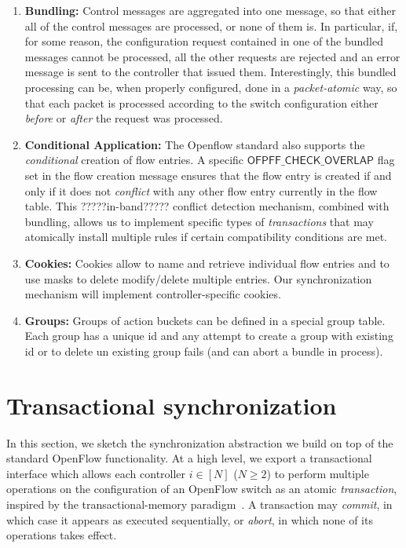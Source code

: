 \documentclass[conference]{sigcomm-alternate}
\begin{document}
\begin{enumerate}
\item \textbf{Bundling:}
Control messages are aggregated into one message, so that either all of the control messages are
processed, or none of them is. In particular, if, for some reason, the
configuration request contained in one of the bundled messages cannot
be processed, all the other requests  are rejected and an error
message is sent to the controller that issued them.
Interestingly, this bundled processing can be, when properly configured, done in a
\emph{packet-atomic} way, so that each packet is processed according
to the switch configuration either \emph{before} or \emph{after} the
request was processed.

\item \textbf{Conditional Application:}
The Openflow standard also supports the \emph{conditional} creation of
flow entries. A specific $\textsf{OFPFF\_CHECK\_OVERLAP}$ flag
set in the flow creation message ensures
that the flow entry is created if and only if it does not \emph{conflict}
with any other flow entry currently in the flow table.
This ?????in-band????? conflict detection mechanism, combined with bundling,
allows us to implement specific types of \emph{transactions} that may
atomically install multiple rules if certain compatibility conditions
are met.

\item \textbf{Cookies:} Cookies allow to name and retrieve individual
flow entries and to use masks to delete modify/delete multiple entries. Our synchronization mechanism will implement controller-specific cookies.

\item \textbf{Groups:} Groups of action buckets can be defined in a special group table. Each group has a unique id and any attempt to create a group with existing id or to delete un existing group fails (and can abort a bundle in process).
\end{enumerate}

\section{Transactional synchronization}\label{sec:vision}

In this section, we sketch the synchronization abstraction we build on
top of the standard OpenFlow functionality. At a high level, we export a
transactional interface which allows each controller $i\in[N]$ ($N\geq
2$) to perform multiple
operations on the configuration of an OpenFlow switch as an atomic
\emph{transaction}, inspired by the transactional-memory paradigm~\cite{stm-st95,tm-book}. A transaction may \emph{commit}, in
which case it appears as executed sequentially, or \emph{abort}, in
which none of its operations takes effect.  
\end{document}
